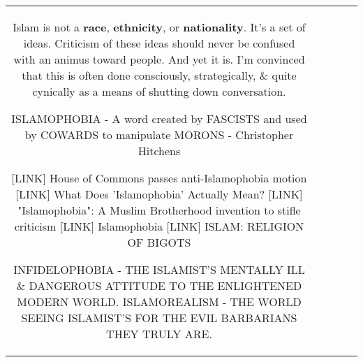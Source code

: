 \documentclass[11pt]{article}
\newlength\mylength
\begin{document}
\begin{center}
\begin{longtable}{|C{.65\mylength}|C{.30\mylength}|C{.12\mylength}|C{.12\mylength}|C{.12\mylength}|}
  \small Islam is not a \textbf{race}, \textbf{ethnicity}, or \textbf{nationality}.   It's a set of ideas.  Criticism of these ideas should never be confused with an animus toward people. And yet it is.  I'm convinced that this is often done consciously, strategically, \& quite cynically as a means of shutting down conversation.

ISLAMOPHOBIA - A word created by FASCISTS and used by COWARDS to manipulate MORONS - Christopher Hitchens

 [LINK] House of Commons passes anti-Islamophobia motion
 [LINK]    What Does 'Islamophobia' Actually Mean?
 [LINK]   "Islamophobia": A Muslim Brotherhood invention to stifle criticism 
 [LINK]    Islamophobia
 [LINK]   ISLAM: RELIGION OF BIGOTS

INFIDELOPHOBIA - THE ISLAMIST'S MENTALLY ILL \& DANGEROUS ATTITUDE TO THE ENLIGHTENED MODERN WORLD.
ISLAMOREALISM - THE WORLD SEEING ISLAMIST'S FOR THE EVIL BARBARIANS THEY TRULY ARE.


\end{longtable}
\end{center}
\end{document}
